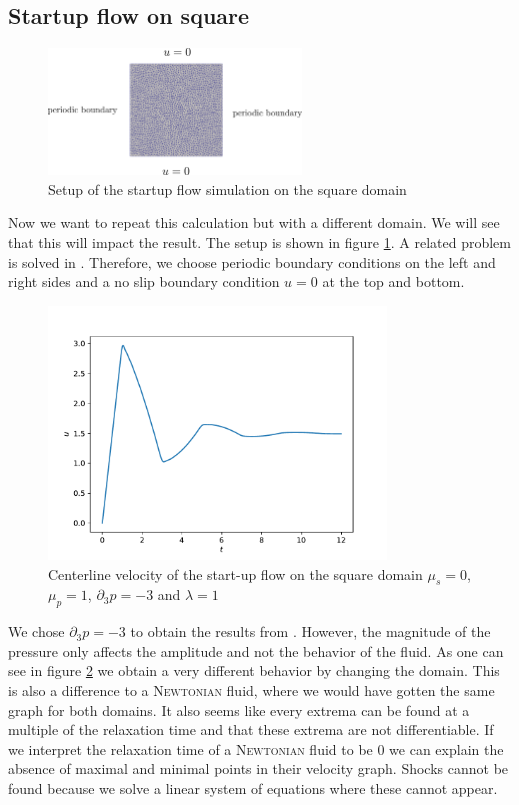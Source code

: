 \documentclass[12pt,a4paper,twoside, open=right]{scrreprt}
\theoremstyle{definition}
\theoremstyle{plain}
\begin{document}
\subsection{Startup flow on square}
\begin{figure}
    \centering
    \includegraphics[width=0.6\textwidth]{Setupsquare}
    \caption{Setup of the startup flow simulation on the square domain}
    \label{fig:squaresetup}
\end{figure}
Now we want to repeat this calculation but with a different domain. We will see that this will impact the result. The setup is shown in figure \ref{fig:squaresetup}. A related problem is solved in \cite{A.S.RDuarte2008}. Therefore, we choose periodic boundary conditions on the left and right sides and a no slip boundary condition $u=0$ at the top and bottom.
\begin{figure}
    \centering
    \includegraphics[width=0.8\textwidth]{Centerlinevel}
    \caption{Centerline velocity of the start-up flow on the square domain $\mu_s=0$, $\mu_p=1$, $\partial_3 p=-3$ and $\lambda=1$}
    \label{fig:squarecenterline}
\end{figure}
We chose $\partial_3 p=-3$ to obtain the results from \cite{A.S.RDuarte2008}. However, the magnitude of the pressure only affects the amplitude and not the behavior of the fluid. As one can see in figure \ref{fig:squarecenterline} we obtain a very different behavior by changing the domain. This is also a difference to a \textsc{Newtonian} fluid, where we would have gotten the same graph for both domains. It also seems like every extrema can be found at a multiple of the relaxation time and that these extrema are not differentiable. If we interpret the relaxation time of a \textsc{Newtonian} fluid to be $0$ we can explain the absence of maximal and minimal points in their velocity graph. Shocks cannot be found because we solve a linear system of equations where these cannot appear. 
\end{document}
